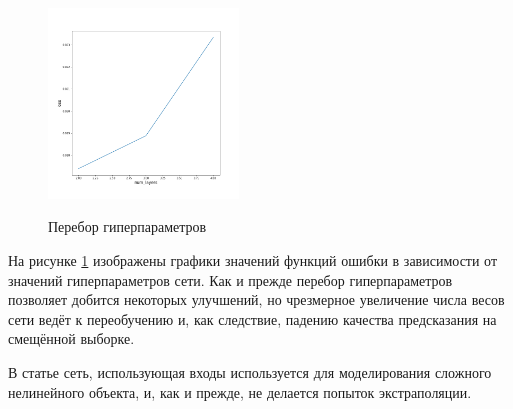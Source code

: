 \documentclass[12pt, oneside]{extbook}
\begin{document}
\begin{flushleft}
\begin{figure}[!ht]
{         \includegraphics[width=0.45\textwidth]{lstm_2_num_layers_search}
     }
     \caption{Перебор гиперпараметров}
     \label{fig:lstm_2_search}
\end{figure}
На рисунке \ref{fig:lstm_2_search} изображены графики значений функций ошибки в зависимости от значений гиперпараметров сети. Как и прежде перебор гиперпараметров позволяет добится некоторых улучшений, но чрезмерное увеличение числа весов сети ведёт к переобучению и, как следствие, падению качества предсказания на смещённой выборке. 
\par В статье \cite{lstm_2017} сеть, использующая входы используется для моделирования сложного нелинейного объекта, и, как и прежде, не делается попыток экстраполяции.

\end{flushleft}
\end{document}
